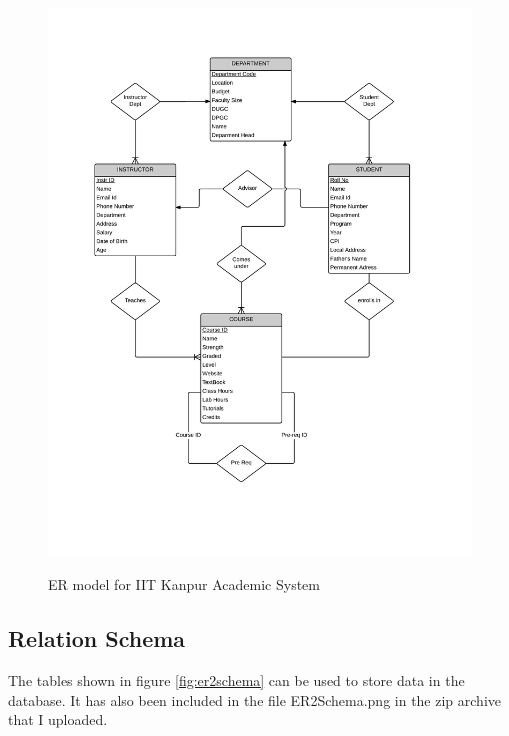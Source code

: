 \documentclass[12pt]{article}%
\begin{document}
\begin{figure}
\includegraphics[width=\textwidth]{ER2.png}
\label{fig:er2}
\caption{ER model for IIT Kanpur Academic System}
\end{figure}

\subsection{Relation Schema}
The tables shown in figure \ref{fig:er2schema} can be used to store data in the database. It has also been included in the file ER2Schema.png in the zip archive that I uploaded. 
\end{document}
